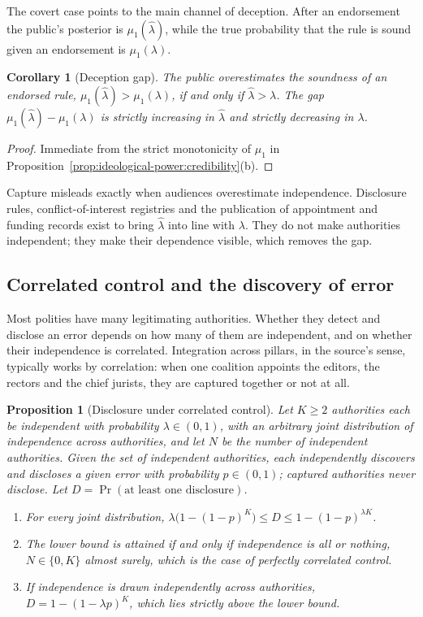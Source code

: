 \documentclass[11pt,letterpaper]{article}
\newtheorem{proposition}[theorem]{Proposition}
\newtheorem{corollary}[theorem]{Corollary}
\theoremstyle{definition}
\theoremstyle{remark}
\newcommand{\Prob}{\Pr}
\begin{document}
The covert case points to the main channel of deception. After an endorsement the public's posterior is $\mu_1(\hat\lambda)$, while the true probability that the rule is sound given an endorsement is $\mu_1(\lambda)$.

\begin{corollary}[Deception gap]
\label{cor:ideological-power:gap}
The public overestimates the soundness of an endorsed rule, $\mu_1(\hat\lambda)>\mu_1(\lambda)$, if and only if $\hat\lambda>\lambda$. The gap $\mu_1(\hat\lambda)-\mu_1(\lambda)$ is strictly increasing in $\hat\lambda$ and strictly decreasing in $\lambda$.
\end{corollary}

\begin{proof}
Immediate from the strict monotonicity of $\mu_1$ in Proposition~\ref{prop:ideological-power:credibility}(b).
\end{proof}

Capture misleads exactly when audiences overestimate independence. Disclosure rules, conflict-of-interest registries and the publication of appointment and funding records exist to bring $\hat\lambda$ into line with $\lambda$. They do not make authorities independent; they make their dependence visible, which removes the gap.

\subsection{Correlated control and the discovery of error}

Most polities have many legitimating authorities. Whether they detect and disclose an error depends on how many of them are independent, and on whether their independence is correlated. Integration across pillars, in the source's sense, typically works by correlation: when one coalition appoints the editors, the rectors and the chief jurists, they are captured together or not at all.

\begin{proposition}[Disclosure under correlated control]
\label{prop:ideological-power:disclosure}
Let $K\geq2$ authorities each be independent with probability $\lambda\in(0,1)$, with an arbitrary joint distribution of independence across authorities, and let $N$ be the number of independent authorities. Given the set of independent authorities, each independently discovers and discloses a given error with probability $p\in(0,1)$; captured authorities never disclose. Let $D=\Prob(\text{at least one disclosure})$.
\begin{enumerate}
\item[(a)] For every joint distribution, $\lambda\bigl(1-(1-p)^K\bigr)\leq D\leq 1-(1-p)^{\lambda K}$.
\item[(b)] The lower bound is attained if and only if independence is all or nothing, $N\in\{0,K\}$ almost surely, which is the case of perfectly correlated control.
\item[(c)] If independence is drawn independently across authorities, $D=1-(1-\lambda p)^K$, which lies strictly above the lower bound.
\end{enumerate}
\end{proposition}
\end{document}
